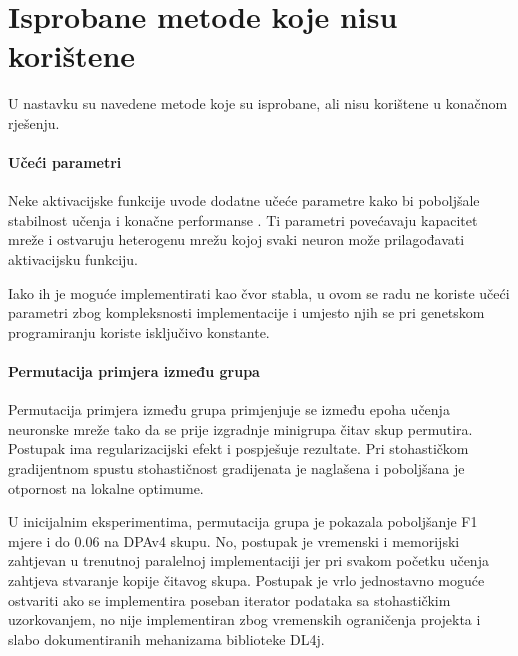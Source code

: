 \documentclass[times, utf8, numeric, diplomski]{fer}
\def\TODO#1{\noindent\textcolor{red}{TODO: \textit{#1}}\newline}
\def\todo#1{\TODO{#1}}
\begin{document}
%

\chapter{Isprobane metode koje nisu korištene}
U nastavku su navedene metode koje su isprobane, ali nisu korištene u konačnom rješenju.

\subsubsection{Učeći parametri}
Neke aktivacijske funkcije uvode dodatne učeće parametre kako bi poboljšale stabilnost učenja i konačne performanse \citep{prelu, apl, network_in_network}. Ti parametri povećavaju kapacitet mreže i ostvaruju heterogenu mrežu kojoj svaki neuron može prilagođavati aktivacijsku funkciju.

Iako ih je moguće implementirati kao čvor stabla, u ovom se radu ne koriste učeći parametri zbog kompleksnosti implementacije i umjesto njih se pri genetskom programiranju koriste isključivo konstante.

\subsubsection{Permutacija primjera između grupa}
Permutacija primjera između grupa primjenjuje se između epoha učenja neuronske mreže tako da se prije izgradnje minigrupa čitav skup permutira. Postupak ima regularizacijski efekt i pospješuje rezultate. Pri stohastičkom gradijentnom spustu stohastičnost gradijenata je naglašena i poboljšana je otpornost na lokalne optimume.

U inicijalnim eksperimentima, permutacija grupa je pokazala poboljšanje F1 mjere i do $0.06$ na DPAv4 skupu. No, postupak je vremenski i memorijski zahtjevan u trenutnoj paralelnoj implementaciji jer pri svakom početku učenja zahtjeva stvaranje kopije čitavog skupa. Postupak je vrlo jednostavno moguće ostvariti ako se implementira poseban iterator podataka sa stohastičkim uzorkovanjem, no nije implementiran zbog vremenskih ograničenja projekta i slabo dokumentiranih mehanizama biblioteke DL4j.
\end{document}
